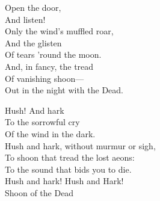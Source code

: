 \documentclass{novel} %
\begin{document}
\thispagestyle{empty}
\vspace*{6\nbs}
\begin{adjustwidth}{7em}{0em}
\noindent Open the door,\\
And listen!\\
Only the wind’s muffled roar,\\
And the glisten\\
Of tears ’round the moon.\\
And, in fancy, the tread\\
Of vanishing shoon---\\
Out in the night with the Dead.\par
\null
\noindent Hush! And hark\\
To the sorrowful cry\\
Of the wind in the dark.\\
Hush and hark, without murmur or sigh,\\
To shoon that tread the lost aeons:\\
To the sound that bids you to die.\\
Hush and hark! Hush and Hark!\\
Shoon of the Dead\par
\end{adjustwidth}
\clearpage
\end{document}
